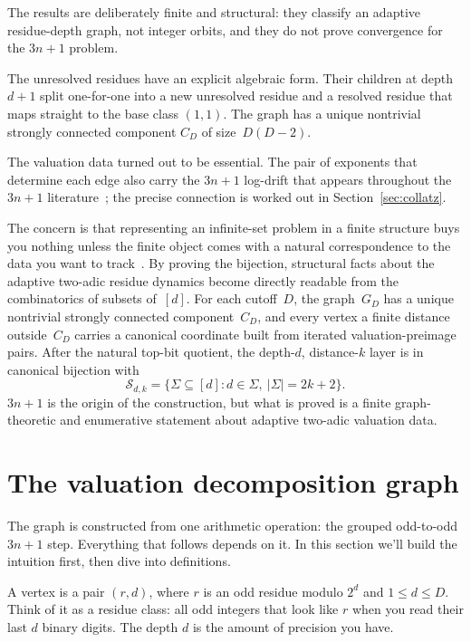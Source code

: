 \documentclass[11pt]{amsart}
\theoremstyle{definition}
\theoremstyle{remark}
\newcommand{\Sfam}{\mathcal S}
\begin{document}
The results are deliberately finite and structural: they classify an adaptive
residue-depth graph, not integer orbits, and they do not prove convergence for
the $3n+1$ problem.

The unresolved residues have an explicit algebraic form.  Their
children at depth $d+1$ split one-for-one into a new unresolved residue and a
resolved residue that maps straight to the base class $(1,1)$.  The graph has
a unique nontrivial strongly connected component $C_D$ of
size~$D(D-2)$.

The valuation data turned out to be essential.  The pair of exponents that
determine each edge also carry the $3n+1$ log-drift that appears throughout
the $3n+1$ literature~\cite{Terras1976, Everett1977, Eliahou1993, Tao2022};
the precise connection is worked out in Section~\ref{sec:collatz}.

The concern is that representing an infinite-set problem in a finite structure 
buys you nothing unless the finite object comes with a natural correspondence 
to the data you want to track~\cite{Stanley2012, FlajoletSedgewick2009}.  By 
proving the bijection, structural facts about the adaptive two-adic residue 
dynamics become directly readable from the combinatorics of subsets of~$[d]$.  
For each cutoff~$D$, the graph~$G_D$ has a unique nontrivial strongly connected
component~$C_D$, and every vertex a finite distance outside~$C_D$ carries a 
canonical coordinate built from iterated valuation-preimage pairs.  After the 
natural top-bit quotient, the depth-$d$, distance-$k$ layer is in canonical bijection 
with
\[
\Sfam_{d,k}=\{\Sigma\subseteq[d]:d\in\Sigma,\ |\Sigma|=2k+2\}.
\]
$3n+1$ is the origin of the construction, but what is proved is a finite
graph-theoretic and enumerative statement about adaptive two-adic valuation
data.

\section{The valuation decomposition graph}\label{sec:valuation}\label{sec:graph}
The graph is constructed from one arithmetic operation: the grouped odd-to-odd $3n+1$ step. Everything that follows depends on it. In this section we'll build the intuition first, then dive into definitions.

A vertex is a pair $(r,d)$, where $r$ is an odd residue modulo $2^d$ and $1\le d\le D$.  Think of it as a residue class: all odd integers that look like $r$ when you read their last $d$ binary digits.  The depth $d$ is the amount of precision you have.
\end{document}
